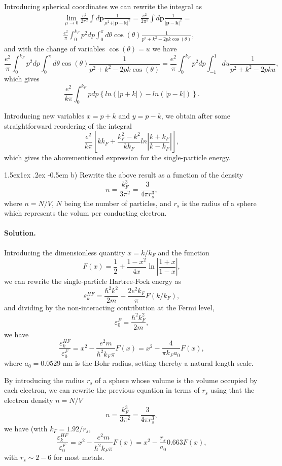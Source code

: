 \documentclass[%
twoside,                 %
final,                   %
10pt]{article}
\makeatletter
\newenvironment{doconceexercise}{}{}
\newcommand\subex{\@startsection{paragraph}{4}{\z@}%
                  {1.5ex\@plus1ex \@minus.2ex}%
                  {-0.5em}%
                  {\normalfont\normalsize\bfseries}}
\makeatother
\begin{document}
\begin{doconceexercise}
Introducing spherical coordinates we can rewrite the integral as 
\begin{align}
\lim_{\mu \to 0}\frac{e^{2}}{ 2\pi^2}  \int d\mathbf{p}\frac{1}{\mu^2+\vert \mathbf{p}-\mathbf{k}\vert^2}=\frac{e^{2}}{ 2\pi^2}  \int d\mathbf{p}\frac{1}{\vert \mathbf{p}-\mathbf{k}\vert^2}=& \\
\frac{e^{2}}{\pi}  \int_0^{k_F} p^2dp\int_0^{\pi} d\theta\cos{(\theta)}\frac{1}{p^2+k^2-2pk\cos{(\theta)}},
\end{align}
and with the change of variables $\cos{(\theta)}=u$ we have 
\[
\frac{e^{2}}{\pi}  \int_0^{k_F} p^2dp\int_{0}^{\pi} d\theta\cos{(\theta)}\frac{1}{p^2+k^2-2pk\cos{(\theta)}}=\frac{e^{2}}{\pi}  \int_0^{k_F} p^2dp\int_{-1}^{1} du\frac{1}{p^2+k^2-2pku},
\]
which gives
\[
\frac{e^{2}}{k\pi}  \int_0^{k_F} pdp\left\{ln(\vert p+k\vert)-ln(\vert p-k\vert)\right\}.
\]

Introducing new variables $x=p+k$ and $y=p-k$, we obtain after some straightforward reordering of the integral
\[
\frac{e^{2}}{k\pi}\left[
kk_F+\frac{k_{F}^{2}-k^{2}}{kk_{F}}ln\left\vert\frac{k+k_{F}}
{k-k_{F}}\right\vert
\right],
\]
which gives the abovementioned expression for the single-particle energy.


\subex{b)}
Rewrite the above result as a function of the density
\[
n= \frac{k_F^3}{3\pi^2}=\frac{3}{4\pi r_s^3},
\]
where $n=N/V$, $N$ being the number of particles, and $r_s$ is the radius of a sphere which represents the volum per conducting electron.


\paragraph{Solution.}
Introducing the dimensionless quantity $x=k/k_F$ and the function
\[
F(x) = \frac{1}{2}+\frac{1-x^2}{4x}\ln{\left\vert \frac{1+x}{1-x}\right\vert},
\]
we can rewrite the single-particle Hartree-Fock energy as 
\[
\varepsilon_{k}^{HF}=\frac{\hbar^{2}k^{2}}{2m}-\frac{2e^{2}
k_{F}}{\pi}F(k/k_F),
\]
and dividing by the non-interacting contribution at the Fermi level, 
\[
\varepsilon_{0}^{F}=\frac{\hbar^{2}k_F^{2}}{2m},
\]
we have
\[
\frac{\varepsilon_{k}^{HF} }{\varepsilon_{0}^{F}}=x^2-\frac{e^2m}{\hbar^2 k_F\pi}F(x)=x^2-\frac{4}{\pi k_Fa_0}F(x),
\]
where $a_0=0.0529$ nm is the Bohr radius, setting thereby a natural length scale. 


By introducing the radius $r_s$ of a sphere whose volume is the volume occupied by each electron, we can rewrite the previous equation in terms of $r_s$ using that the electron density $n=N/V$
\[
n=\frac{k_F^3}{3\pi^2} = \frac{3}{4\pi r_s^3},
\]
we have (with $k_F=1.92/r_s$,
\[
\frac{\varepsilon_{k}^{HF} }{\varepsilon_{0}^{F}}=x^2-\frac{e^2m}{\hbar^2 k_F\pi}F(x)=x^2-\frac{r_s}{a_0}0.663F(x),
\]
with $r_s \sim 2-6$ for most metals.


\end{doconceexercise}
\end{document}

